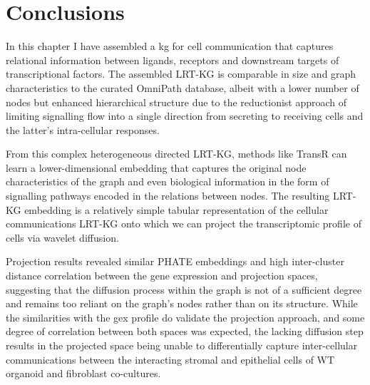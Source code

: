 \newpage
\section{Conclusions}



In this chapter I have assembled a \acrlong{kg} for cell communication that captures relational information between ligands, receptors and downstream targets of transcriptional factors. The assembled LRT-KG is comparable in size and graph characteristics to the curated OmniPath database, albeit with a lower number of nodes but enhanced hierarchical structure due to the reductionist approach of limiting signalling flow into a single direction from secreting to receiving cells and the latter's intra-cellular responses. 

From this complex heterogeneous directed LRT-KG, methods like TransR can learn a lower-dimensional embedding that captures the original node characteristics of the graph and even biological information in the form of signalling pathways encoded in the relations between nodes. 
The resulting LRT-KG embedding is a relatively simple tabular representation of the cellular communications LRT-KG onto which we can project the transcriptomic profile of cells via wavelet diffusion.

Projection results revealed similar PHATE embeddings and high inter-cluster distance correlation between the gene expression and projection spaces, suggesting that the diffusion process within the graph is not of a sufficient degree and remains too reliant on the graph's nodes rather than on its structure. 
While the similarities with the \acrshort{gex} profile do validate the projection approach, and some degree of correlation between both spaces was expected, the lacking diffusion step results in the projected space being unable to differentially capture inter-cellular communications between the interacting stromal and epithelial cells of WT organoid and fibroblast co-cultures.



